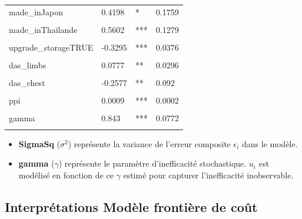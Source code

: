 \documentclass[
  12pt,
]{report}
\begin{document}
\begin{table}[!h]
\begin{tabular}[t]{llll}
made\_inJapon & 0.4198 & * & 0.1759\\
\addlinespace
\cellcolor{gray!6}{made\_inTaïwan} & \cellcolor{gray!6}{0.5157} & \cellcolor{gray!6}{*} & \cellcolor{gray!6}{0.2204}\\
made\_inThaïlande & 0.5602 & *** & 0.1279\\
\cellcolor{gray!6}{made\_inViêt Nam} & \cellcolor{gray!6}{-0.09} & \cellcolor{gray!6}{} & \cellcolor{gray!6}{0.0515}\\
upgrade\_storageTRUE & -0.3295 & *** & 0.0376\\
\cellcolor{gray!6}{das\_head} & \cellcolor{gray!6}{-0.1986} & \cellcolor{gray!6}{***} & \cellcolor{gray!6}{0.059}\\
\addlinespace
das\_limbs & 0.0777 & ** & 0.0296\\
\cellcolor{gray!6}{fast\_chargingTRUE} & \cellcolor{gray!6}{-0.1706} & \cellcolor{gray!6}{**} & \cellcolor{gray!6}{0.0558}\\
das\_chest & -0.2577 & ** & 0.092\\
\cellcolor{gray!6}{network5G} & \cellcolor{gray!6}{0.3049} & \cellcolor{gray!6}{***} & \cellcolor{gray!6}{0.0357}\\
ppi & 0.0009 & *** & 0.0002\\
\addlinespace
\cellcolor{gray!6}{sigmaSq} & \cellcolor{gray!6}{0.1826} & \cellcolor{gray!6}{*} & \cellcolor{gray!6}{0.0864}\\
gamma & 0.843 & *** & 0.0772\\
\cellcolor{gray!6}{mu} & \cellcolor{gray!6}{-0.7846} & \cellcolor{gray!6}{} & \cellcolor{gray!6}{0.6691}\\
\bottomrule
\end{tabular}
\end{table}

\begin{itemize}
\item
  \textbf{SigmaSq} (\(\sigma^2\)) représente la variance de l'erreur
  composite \(\epsilon_i\) dans le modèle.
\item
  \textbf{gamma} (\(\gamma\)) représente le paramètre d'inefficacité
  stochastique. \(u_i\)\hspace{0pt} est modélisé en fonction de ce
  \(\gamma\) estimé pour capturer l'inefficacité inobservable.
\end{itemize}

\newpage

\subsection{Interprétations Modèle frontière de
coût}\label{interpruxe9tations-moduxe8le-frontiuxe8re-de-couxfbt}
\end{document}
